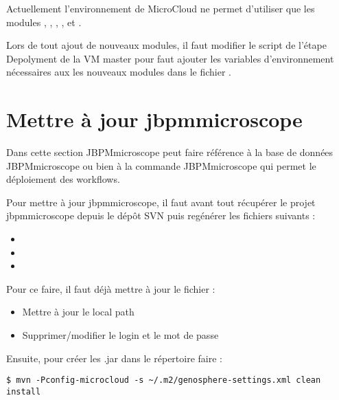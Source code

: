 Actuellement l'environnement de MicroCloud ne permet d'utiliser que les modules , , , ,  et .
\newline

\begin{mycolorbox}
    Lors de tout ajout de nouveaux modules, il faut modifier le script de l'étape Depolyment de la VM master
    pour faut ajouter les variables d'environnement nécessaires aux les nouveaux modules
    dans le fichier .
\end{mycolorbox}

\section{Mettre à jour jbpmmicroscope} \label{sec:nouvelle_version_jbpmmicroscope}

Dans cette section JBPMmicroscope peut faire référence à la base de données JBPMmicroscope ou bien à la commande JBPMmicroscope qui permet le déploiement des workflows.
\newline

Pour mettre à jour jbpmmicroscope, il faut avant tout récupérer le projet jbpmmicroscope depuis le dépôt SVN puis regénérer les fichiers suivants :
\begin{itemize}
    \item {}
    \item {}
    \item {}
\end{itemize}
\bigskip

Pour ce faire, il faut déjà mettre à jour le fichier  :
\begin{itemize}
    \item Mettre à jour le local path
    \item Supprimer/modifier le login et le mot de passe
\end{itemize}
\bigskip

Ensuite, pour créer les .jar dans le répertoire  faire :

\begin{lstlisting}[style=bash]
$ mvn -Pconfig-microcloud -s ~/.m2/genosphere-settings.xml clean install
\end{lstlisting}
\bigskip

